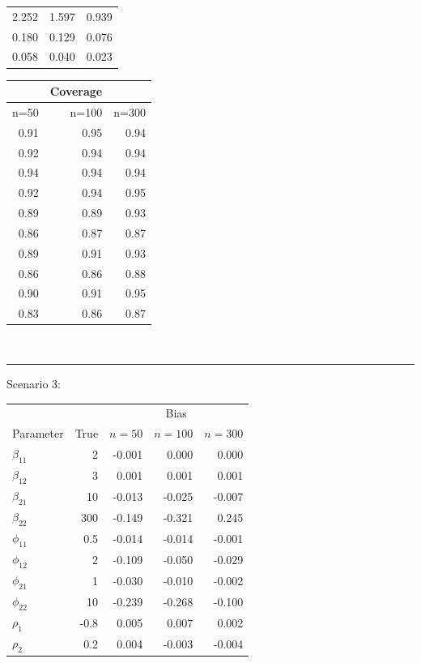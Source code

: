 \documentclass[useAMS,referee]{biom}
\begin{document}
\begin{table}[htb]
\begin{minipage}[b]{.28\textwidth}
\begin{tabular}{rrr}
	2.252&	1.597&	0.939\\
	0.180&	0.129&	0.076\\
	0.058&	0.040&	0.023\\
\end{tabular}
\end{minipage}
\begin{minipage}[b]{.1\textwidth}
\begin{tabular}{rrr} 
	& \multicolumn{1}{c}{Coverage} & \\ 
	\hline
	n=50 & n=100 & n=300   \\ 	
	\midrule 
	0.91&	0.95&	0.94\\
	0.92&	0.94&	0.94\\
	0.94&	0.94&	0.94\\
	0.92&	0.94&	0.95\\
	0.89&	0.89&	0.93\\
	0.86&	0.87&	0.87\\
	0.89&	0.91&	0.93\\
	0.86&	0.86&	0.88\\
	0.90&	0.91&	0.95\\
	0.83&	0.86&	0.87\\ 		
\end{tabular}
\end{minipage}
\\\hrule\vspace{0.2cm}
Scenario 3:\\
\begin{minipage}[b]{.43\textwidth}	
\begin{tabular}{lrrrr} 
	& &   \multicolumn{3}{c}{Bias}  \\ 
	\cmidrule{3-5}
	Parameter	&  True & $n=50$ & $n=100$ & $n=300$   \\ 			\midrule 
	$\beta_{11}$ &	2&-0.001&	0.000&	0.000\\
	$\beta_{12}$ &	3&0.001&	0.001&	0.001\\
	$\beta_{21}$&10&-0.013&	-0.025&	-0.007\\
	$\beta_{22}$&300&-0.149&	-0.321&	0.245\\
	$\phi_{11}$	&0.5& -0.014&	-0.014&	-0.001\\
	$\phi_{12}$&2&	-0.109&	-0.050&	-0.029\\
	$\phi_{21}$	&1&	-0.030&	-0.010&	-0.002\\
	$\phi_{22}$	&10&-0.239&	-0.268&	-0.100\\
	$\rho_1$ &-0.8	&0.005&	0.007&	0.002\\
	$\rho_2$&	0.2	&
	0.004&	-0.003&	-0.004\\

\end{tabular}
\end{minipage}
\end{table}
\end{document}
